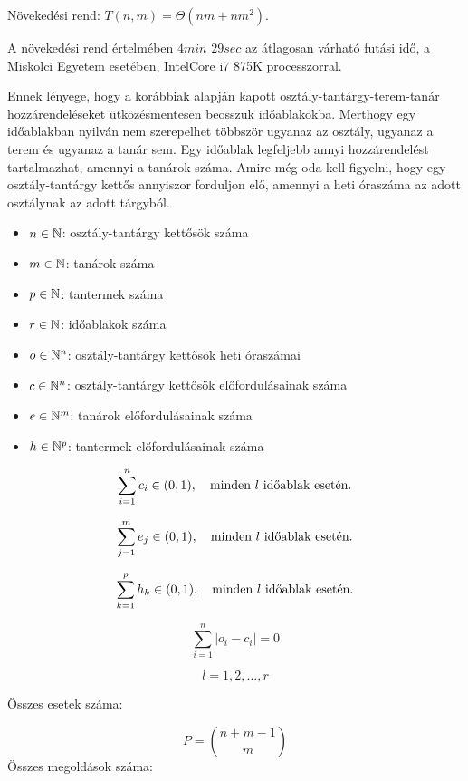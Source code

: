 Növekedési rend: $T(n,m)=\Theta (nm+nm^2).$

A növekedési rend értelmében $4min$ $29sec$ az átlagosan várható futási idő, a Miskolci Egyetem esetében, IntelCore i7 875K processzorral. 



Ennek lényege, hogy a korábbiak alapján kapott osztály-tantárgy-terem-tanár
hozzárendeléseket ütközésmentesen beosszuk időablakokba. Merthogy egy időablakban nyilván nem szerepelhet többször ugyanaz az osztály, ugyanaz a terem és ugyanaz a tanár sem. Egy időablak legfeljebb annyi hozzárendelést tartalmazhat, amennyi a tanárok száma. Amire még oda kell figyelni, hogy egy osztály-tantárgy kettős annyiszor forduljon elő, amennyi a heti óraszáma az adott osztálynak az adott tárgyból.


\begin{itemize}
	\item $n \in \Bbb{N}$: osztály-tantárgy kettősök száma
	\item $m \in \Bbb{N}$: tanárok száma
	\item $p \in \Bbb{N}$: tantermek száma
	\item $r \in \Bbb{N}$: időablakok száma
	\item $o \in \Bbb{N}^n$: osztály-tantárgy kettősök heti óraszámai
	\item $c \in \Bbb{N}^n$: osztály-tantárgy kettősök előfordulásainak száma
	\item $e \in \Bbb{N}^m$: tanárok előfordulásainak száma
	\item $h \in \Bbb{N}^p$: tantermek előfordulásainak száma
\end{itemize}

$$\sum_{i=1}^n c_i \in (0,1), \quad \hbox{minden }l\hbox{ időablak esetén.}$$

$$\sum_{j=1}^m e_j \in (0,1), \quad \hbox{minden }l\hbox{ időablak esetén.}$$

$$\sum_{k=1}^p h_k \in (0,1), \quad \hbox{minden }l\hbox{ időablak esetén.}$$

$$\sum_{i=1}^n \vert o_i - c_i \vert = 0$$

$$l=1, 2, \ldots, r$$


Összes esetek száma:

$$P=\binom{n+m-1}{m}$$
Összes megoldások száma:

